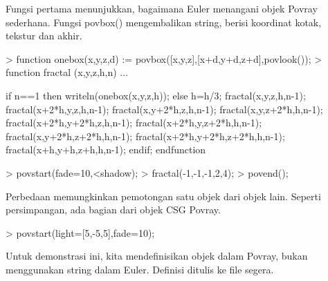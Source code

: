 \documentclass{report}
\begin{document}
\begin{eulernotebook}
\begin{eulercomment}
\begin{eulercomment}
\begin{eulercomment}
Fungsi pertama menunjukkan, bagaimana Euler menangani objek Povray
sederhana. Fungsi povbox() mengembalikan string, berisi koordinat
kotak, tekstur dan akhir.
\end{eulercomment}
\begin{eulerprompt}
> function onebox(x,y,z,d) := povbox([x,y,z],[x+d,y+d,z+d],povlook());
> function fractal (x,y,z,h,n) ...
\end{eulerprompt}
\begin{eulerudf}
   if n==1 then writeln(onebox(x,y,z,h));
   else
     h=h/3;
     fractal(x,y,z,h,n-1);
     fractal(x+2*h,y,z,h,n-1);
     fractal(x,y+2*h,z,h,n-1);
     fractal(x,y,z+2*h,h,n-1);
     fractal(x+2*h,y+2*h,z,h,n-1);
     fractal(x+2*h,y,z+2*h,h,n-1);
     fractal(x,y+2*h,z+2*h,h,n-1);
     fractal(x+2*h,y+2*h,z+2*h,h,n-1);
     fractal(x+h,y+h,z+h,h,n-1);
   endif;
  endfunction
\end{eulerudf}
\begin{eulerprompt}
> povstart(fade=10,<shadow);
> fractal(-1,-1,-1,2,4);
> povend();
\end{eulerprompt}
\begin{eulercomment}
Perbedaan memungkinkan pemotongan satu objek dari objek lain. Seperti
persimpangan, ada bagian dari objek CSG Povray.
\end{eulercomment}
\begin{eulerprompt}
> povstart(light=[5,-5,5],fade=10);
\end{eulerprompt}
\begin{eulercomment}
Untuk demonstrasi ini, kita mendefinisikan objek dalam Povray, bukan
menggunakan string dalam Euler. Definisi ditulis ke file segera.


\end{eulercomment}
\end{eulercomment}
\end{eulercomment}
\end{eulernotebook}
\end{document}
